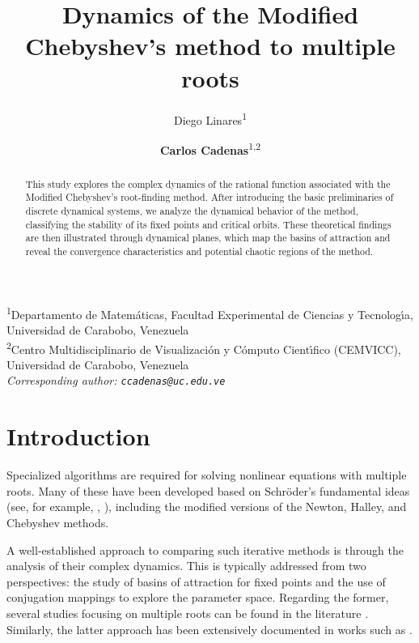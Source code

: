 \documentclass{article}
\title{Dynamics of the Modified Chebyshev's method to multiple roots}
\author{
	{\large Diego Linares}\textsuperscript{1}
	\and
	{\large \textbf{Carlos Cadenas}}\textsuperscript{1,2}
}
\theoremstyle{definition}
\theoremstyle{remark}
\begin{document}
	\maketitle
	
	\begin{center}
		\footnotesize
		\textsuperscript{1}Departamento de Matem\'aticas, Facultad Experimental de Ciencias y Tecnolog\'{\i}a, Universidad de Carabobo, Venezuela\\
		\textsuperscript{2}Centro Multidisciplinario de Visualizaci\'on y C\'omputo Cient\'{\i}fico (CEMVICC), Universidad de Carabobo, Venezuela\\[2ex]
		\textit{Corresponding author: \texttt{ccadenas@uc.edu.ve}}
	\end{center}
	\begin{abstract}
		This study explores the complex dynamics of the rational function associated with the Modified Chebyshev's root-finding method. After introducing the basic preliminaries of discrete dynamical systems, we analyze the dynamical behavior of the method, classifying the stability of its fixed points and critical orbits. These theoretical findings are then illustrated through dynamical planes, which map the basins of attraction and reveal the convergence characteristics and potential chaotic regions of the method.
	\end{abstract}




	\section{Introduction}

	Specialized algorithms are required for solving nonlinear equations with multiple roots. Many of these have been developed based on Schröder's fundamental ideas (see, for example, \cite{SAkram2019, SAkram2021, HArora2022}, \cite{CECadenas2018a, CECadenas2018b}), including the modified versions of the Newton, Halley, and Chebyshev methods.

	A well-established approach to comparing such iterative methods is through the analysis of their complex dynamics. This is typically addressed from two perspectives: the study of basins of attraction for fixed points and the use of conjugation mappings to explore the parameter space. Regarding the former, several studies focusing on multiple roots can be found in the literature \cite{KKneisl2001, MKansal2020, DKumar2020, FChicharro2020, FChicharro2022, DKumar2018}. Similarly, the latter approach has been extensively documented in works such as \cite{ESchroder1870, Cadenas2024, BNeta2022, Torregrosa2022, Vazquez2018, FZafar2018a, FZafar2018, FZafar2018b, FZafar2022,  TSingh2023, FZafar2023}.
\end{document}

